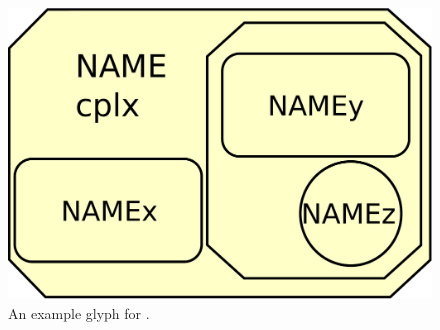 \begin{figure}[H]
  \centering
  \includegraphics[scale = 0.3]{images/complex}
  \caption{An example \PD glyph for .}
  \label{fig:complex}
\end{figure}



